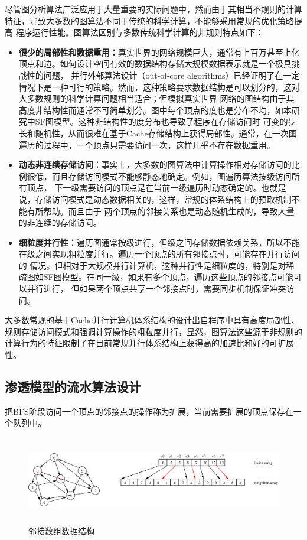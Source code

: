 \begin{flushleft}
尽管图分析算法广泛应用于大量重要的实际问题中，然而由于其相当不规则的计算特征，导致大多数的图算法不同于传统的科学计算，不能够采用常规的优化策略提高
程序运行性能。图算法区别与多数传统科学计算的非规则特点如下：
\begin{itemize}
	\item {\bf
		很少的局部性和数据重用：}真实世界的网络规模巨大，通常有上百万甚至上亿顶点和边。如何设计空间有效的数据结构存储大规模数据表示就是一个极具挑战性的问题，
	并行外部算法设计（out-of-core
	algorithms）已经证明了在一定情况下是一种可行的策略。然而，这种策略要求数据结构是可以划分的，这对大多数规则的科学计算问题相当适合；但模拟真实世界
	网络的图结构由于其高度非结构性而通常不可简单划分。图中每个顶点的度也是分布不均，如本研究中SF图模型。这种非结构性的度分布也导致了程序在存储访问时
	可变的步长和随机性，从而很难在基于Cache存储结构上获得局部性。通常，在一次图遍历的过程中，一个顶点只需要访问一次，这样几乎不存在数据重用。
	\item {\bf
		动态非连续存储访问：}事实上，大多数的图算法中计算操作相对存储访问的比例很低，而且存储访问模式不能够静态地确定。例如，图遍历算法按级访问所有顶点，
	下一级需要访问的顶点是在当前一级遍历时动态确定的。也就是说，存储访问模式是动态数据相关的，这样，常规的体系结构上的预取机制不能有所帮助。而且由于
	两个顶点的邻接关系也是动态随机生成的，导致大量的非连续的存储访问。
	\item {\bf
		细粒度并行性：}遍历图通常按级进行，但级之间存储数据依赖关系，所以不能在级之间实现粗粒度并行。遍历一个顶点的所有邻接点时，可能存在并行访问的
	情况。但相对于大规模并行计算机，这种并行性是细粒度的，特别是对稀疏图如SF图模型。在同一级，如果有多个顶点，遍历这些顶点的邻接点可能可以并行进行，
	但如果两个顶点共享一个邻接点时，需要同步机制保证冲突访问。
\end{itemize}

大多数常规的基于Cache并行计算机体系结构的设计出自程序中具有高度局部性、规则存储访问模式和强调计算操作的粗粒度并行，显然，图算法这些源于非规则的计算行为的特征限制了在目前常规并行体系结构上获得高的加速比和好的可扩展性。


\subsection{渗透模型的流水算法设计}
把BFS阶段访问一个顶点的邻接点的操作称为扩展，当前需要扩展的顶点保存在一个队列中。

\begin{figure}[htbp]
	\begin{center}
		\includegraphics[width=6in,height=1.5in]{Img/Chap_Algorithm/adjacent}
		\caption{邻接数组数据结构}
		\label{fig:adjacent}
	\end{center}
\end{figure}


\end{flushleft}
